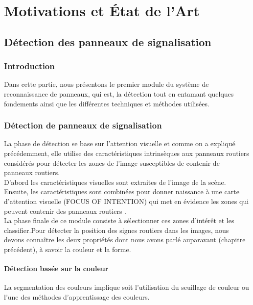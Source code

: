 \part{ Motivations et État de l’Art}
\label{chap:deuxiemme}

\chapter{Détection des panneaux de signalisation}
\minitoc
\section{Introduction}
Dans cette partie, nous présentons le premier module du système de reconnaissance de panneaux, qui est, la détection tout en entamant quelques fondements ainsi que les différentes techniques et méthodes utilisées.

\section{Détection de panneaux de signalisation}

La phase de détection se base sur l’attention visuelle \cite{11} et comme on a expliqué précédemment, elle utilise des caractéristiques intrinsèques aux panneaux routiers considérés pour détecter les zones de l’image susceptibles de contenir de panneaux routiers.\\

D’abord les caractéristiques visuelles sont extraites de l’image de la scène. Ensuite, les caractéristiques sont combinées pour donner naissance à une carte d’attention visuelle (FOCUS OF INTENTION) qui met en évidence les zones qui peuvent contenir des panneaux routiers .\\
La phase finale de ce module consiste à sélectionner ces zones d’intérêt et les classifier.Pour détecter la position des signes routiers dans les images, nous devons connaître les deux propriétés dont nous avons parlé auparavant (chapitre précédent), à savoir la couleur et la forme.\\

\subsection{Détection basée sur la couleur}

La segmentation des couleurs implique soit l’utilisation du seuillage de couleur ou l'une des méthodes d'apprentissage des couleurs.\\ 

